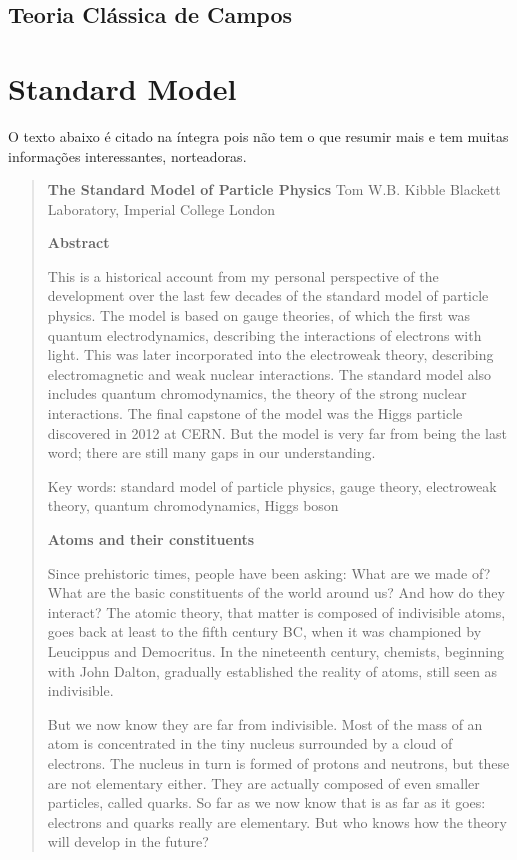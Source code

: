 \subsection{Teoria Clássica de Campos}

\section{Standard Model}

O texto abaixo é citado na íntegra pois não tem o que resumir mais e tem muitas informações interessantes, norteadoras.
\begin{quote}
\begin{center}
\textbf{The Standard Model of Particle Physics}
Tom W.B. Kibble
Blackett Laboratory, Imperial College London
\end{center}

\textbf{Abstract}

This is a historical account from my personal perspective of the development over the last few decades of the standard model of particle physics. The model is based on gauge theories, of which the first was quantum electrodynamics, describing the interactions of electrons with light. This was later incorporated into the electroweak theory, describing electromagnetic and weak nuclear interactions. The standard model also includes quantum chromodynamics, the theory of the strong nuclear interactions. The final capstone of the model was the Higgs particle discovered in 2012 at CERN. But the model is very far from being the last word; there are still many gaps in our understanding.

Key words: standard model of particle physics, gauge theory, electroweak theory, quantum
chromodynamics, Higgs boson

\textbf{Atoms and their constituents}

Since prehistoric times, people have been asking: What are we made of? What are the basic constituents of the world around us? And how do they interact? The atomic theory, that matter is composed of indivisible atoms, goes back at least to the fifth century BC, when it was championed by Leucippus and Democritus. In the nineteenth century, chemists, beginning with John Dalton, gradually established the reality of atoms, still seen as indivisible.

But we now know they are far from indivisible. Most of the mass of an atom is concentrated in the tiny nucleus surrounded by a cloud of electrons. The nucleus in turn is formed of protons and neutrons, but these are not elementary either. They are actually composed of even smaller particles, called quarks. So far as we now know that is as far as it goes: electrons and quarks really are elementary. But who knows how the theory will develop in the future?


\end{quote}
